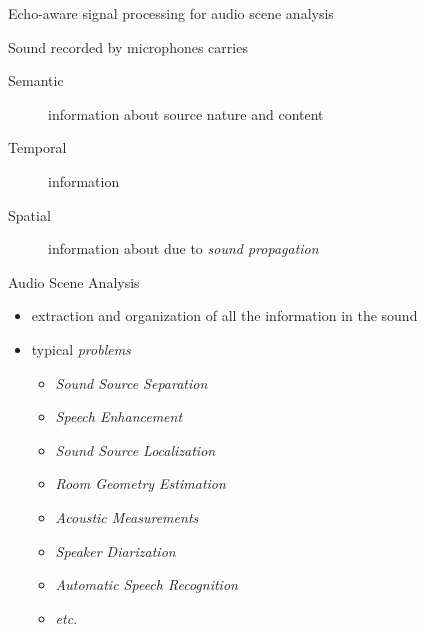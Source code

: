 \documentclass[9pt,dvipsnames]{beamer}
\renewenvironment{block}[1]{\begin{oldblock}{#1}\smallskip}{\end{oldblock}}
\begin{document}
    \begin{frame}{Echo-aware signal processing for \alert{audio scene analysis}}
        
        \begin{block}{Sound recorded by microphones carries}
            \begin{description}
                \item[Semantic] information about source nature and content
                \item[Temporal] information
                \item[Spatial] information about due to \textit{sound propagation}
            \end{description}
        \end{block}
        
        
        \begin{block}{Audio Scene Analysis}
            \begin{itemize}
                \item extraction and organization of all the information in the sound
                \item typical \textit{problems}
                \begin{multicols}{2}
                \begin{itemize}
                    \item \alert{\textit{Sound Source Separation}}
                    \item \alert{\textit{Speech Enhancement}}
                    \item \alert{\textit{Sound Source Localization}}
                    \item \alert{\textit{Room Geometry Estimation}}
                    \item \textit{Acoustic Measurements}
                    \item \textit{Speaker Diarization}
                    \item \textit{Automatic Speech Recognition}
                    \item \textit{etc}.
                \end{itemize}
                \end{multicols}
            \end{itemize}
        \end{block}
        
    \end{frame}
\end{document}

